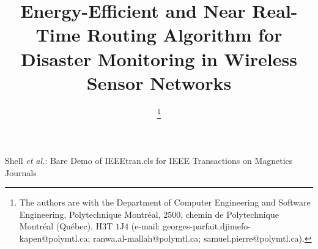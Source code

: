 \documentclass[12pt, onecolumn, journal]{IEEEtran}
\begin{document}
%
\title{Energy-Efficient and Near Real-Time Routing Algorithm for Disaster Monitoring in Wireless Sensor Networks}




\author{
\thanks{The authors are with the Department of Computer Engineering and Software Engineering, Polytechnique Montréal, $2500$, chemin de Polytechnique
Montréal (Québec), H$3$T $1$J$4$ (e-mail: georges-parfait.djimefo-kapen@polymtl.ca; ranwa.al-mallah@polymtl.ca; samuel.pierre@polymtl.ca).}}



%
{Shell \MakeLowercase{\textit{et al.}}: Bare Demo of IEEEtran.cls for IEEE Transactions on Magnetics Journals}
% 
\end{document}
